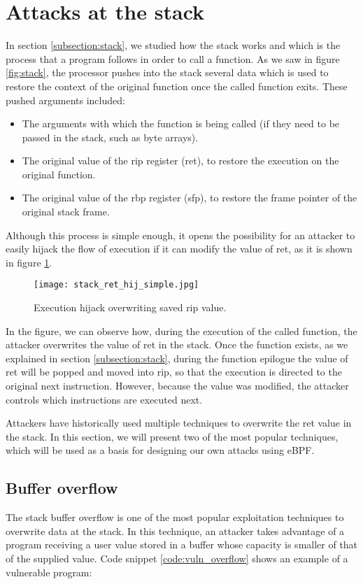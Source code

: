 \section{Attacks at the stack} \label{section:attacks_stack}
In section \ref{subsection:stack}, we studied how the stack works and which is the process that a program follows in order to call a function. As we saw in figure \ref{fig:stack}, the processor pushes into the stack several data which is used to restore the context of the original function once the called function exits. These pushed arguments included:
\begin{itemize}
\item The arguments with which the function is being called (if they need to be passed in the stack, such as byte arrays).
\item The original value of the rip register (ret), to restore the execution on the original function.
\item The original value of the rbp register (sfp), to restore the frame pointer of the original stack frame.
\end{itemize}

Although this process is simple enough, it opens the possibility for an attacker to easily hijack the flow of execution if it can modify the value of ret, as it is shown in figure \ref{fig:stack_ret_hij_simple}.
\begin{figure}[htbp]
	\centering
	\texttt{[image: stack\_ret\_hij\_simple.jpg]}
	\caption{Execution hijack overwriting saved rip value.}
	\label{fig:stack_ret_hij_simple}
\end{figure}

In the figure, we can observe how, during the execution of the called function, the attacker overwrites the value of ret in the stack. Once the function exists, as we explained in section \ref{subsection:stack}, during the function epilogue the value of ret will be popped and moved into rip, so that the execution is directed to the original next instruction. However, because the value was modified, the attacker controls which instructions are executed next.

Attackers have historically used multiple techniques to overwrite the ret value in the stack. In this section, we will present two of the most popular techniques, which will be used as a basis for designing our own attacks using eBPF.

\subsection{Buffer overflow} \label{subsection: buf_overflow}
The stack buffer overflow is one of the most popular exploitation techniques to overwrite data at the stack. In this technique, an attacker takes advantage of a program receiving a user value stored in a buffer whose capacity is smaller of that of the supplied value. Code snippet \ref{code:vuln_overflow} shows an example of a vulnerable program:

